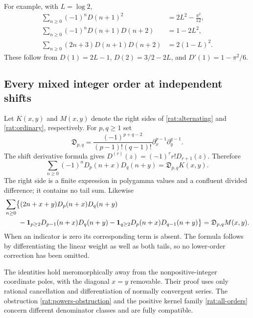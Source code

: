For example, with $L=\log2$,
\begin{align}
 \sum_{n\ge0}(-1)^nD(n+1)^2&=2L^2-\frac{\pi^2}{12},\label{rat:example1}\\
 \sum_{n\ge0}(-1)^nD(n+1)D(n+2)&=1-2L^2,\label{rat:example2}\\
 \sum_{n\ge0}(2n+3)D(n+1)D(n+2)&=2(1-L)^2.\label{rat:example3}
\end{align}
These follow from $D(1)=2L-1$, $D(2)=3/2-2L$, and
$D'(1)=1-\pi^2/6$.

\subsection{Every mixed integer order at independent shifts}

Let $K(x,y)$ and $M(x,y)$ denote the right sides of
\eqref{rat:alternating} and \eqref{rat:ordinary}, respectively.
For $p,q\ge1$ set
\[
 \mathfrak D_{p,q}=
 \frac{(-1)^{p+q-2}}{(p-1)!(q-1)!}
       \partial_x^{p-1}\partial_y^{q-1}.
\]
The shift derivative formula gives
$D^{(r)}(z)=(-1)^rr!D_{r+1}(z)$. Therefore
\begin{equation}\label{rat:all-orders}
 \boxed{\sum_{n\ge0}(-1)^nD_p(n+x)D_q(n+y)
                    =\mathfrak D_{p,q}K(x,y).}
\end{equation}
The right side is a finite expression in polygamma values and a
confluent divided difference; it contains no tail sum. Likewise
\begin{align}
 &\sum_{n\ge0}\bigl\{(2n+x+y)D_p(n+x)D_q(n+y)\notag\\
 &\qquad-\boldsymbol1_{p\ge2}D_{p-1}(n+x)D_q(n+y)
          -\boldsymbol1_{q\ge2}D_p(n+x)D_{q-1}(n+y)\bigr\}
            =\mathfrak D_{p,q}M(x,y).\label{rat:all-orders-ordinary}
\end{align}
When an indicator is zero its corresponding term is absent. The
formula follows by differentiating the linear weight as well as both
tails, so no lower-order correction has been omitted.

The identities hold meromorphically away from the nonpositive-integer
coordinate poles, with the diagonal $x=y$ removable. Their proof uses
only rational cancellation and differentiation of normally convergent
series. The obstruction \eqref{rat:powers-obstruction} and the positive
kernel family \eqref{rat:all-orders} concern different denominator
classes and are fully compatible.
